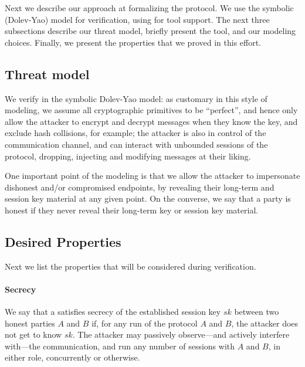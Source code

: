 
Next we describe our approach at formalizing the \mEdhoc{} protocol. We use the
symbolic (Dolev-Yao) model for verification, using \mTamarin{} for tool support.
%
The next three subsections describe our threat model, briefly present the
\mTamarin{} tool, and our modeling choices.
%
Finally, we present the properties that we proved in this effort.

\subsection{Threat model}\label{sec:threat-model}
We verify \mEdhoc{} in the symbolic Dolev-Yao model: as customary in this style of
modeling, we assume all cryptographic primitives to be ``perfect'', and hence
only allow the attacker to encrypt and decrypt messages when they know the key,
and exclude hash collisions, for example; the attacker is also in control of the
communication channel, and can interact with unbounded sessions of the protocol,
dropping, injecting and modifying messages at their liking.

One important point of the modeling is that we allow the attacker to impersonate
dishonest and/or compromised endpoints, by revealing their long-term and session
key material at any given point.
%
On the converse, we say that a party is honest if they never reveal their
long-term key or session key material.

\subsection{Desired Properties}
\label{sec:desired-properties}
Next we list the properties that will be considered during verification.

\paragraph{Secrecy}
We say that a \mEdhoc{} satisfies secrecy of the established session key $sk$
between two honest parties $A$ and $B$ if, for any run of the protocol $A$ and
$B$, the attacker does not get to know $sk$.
%
The attacker may passively observe---and actively interfere with---the
communication, and run any number of sessions with $A$ and $B$, in either role,
concurrently or otherwise.

